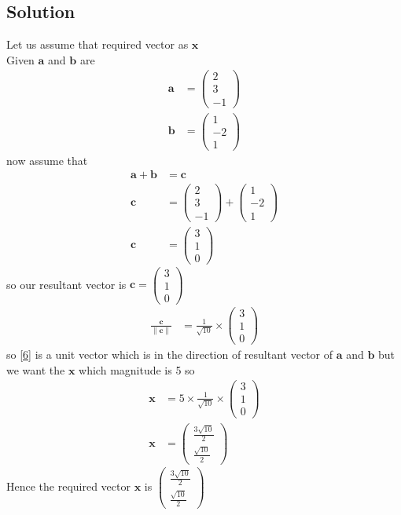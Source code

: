 \documentclass[12pt]{article}
\newcommand{\myvec}[1]{\ensuremath{\begin{pmatrix}#1\end{pmatrix}}}
\providecommand{\norm}[1]{\left\lVert#1\right\rVert}
\let\vec\mathbf
\begin{document}
\begin{enumerate}
\section{Solution}
Let us assume that required vector as $\vec{x}$\\ 
Given $\vec{a}$ and $\vec{b}$ are
\begin{align}
\vec{a}&=\myvec{2\\3\\-1}\\
\vec{b}&=\myvec{1\\-2\\1}
\end{align}
now assume that
\begin{align}
\vec{a}+\vec{b}&= \vec{c}\\
\vec{c}&= \myvec{2\\3\\-1}+\myvec{1\\-2\\1}\\
\vec{c}&=\myvec{3\\1\\0}
\end{align}
so our resultant vector is $\vec{c}=\myvec{3\\ 1\\ 0}$\\
\begin{align}
 \frac{\vec{c}}{\norm{\vec{c}}} &= \frac{1}{\sqrt{10}}\times\myvec{3\\ 1\\ 0}\label{6}
\end{align}
so \eqref{6} is a unit vector which is in the  direction of resultant vector of $\vec{a}$ and $\vec{b}$ but we want the $\vec{x}$ which  magnitude is  5 so 
\begin{align}
 \vec{x}&=5\times \frac{1}{\sqrt{10}}\times\myvec{3\\ 1\\ 0} \\
 \vec{x}&=\myvec{\frac{3\sqrt{10}}{2}\\ \frac{\sqrt{10}}{2}}
\end{align}
Hence the required vector $\vec{x}$ is $\myvec{\frac{3\sqrt{10}}{2}\\ \frac{\sqrt{10}}{2}}$
\end{enumerate} 
\end{document}
